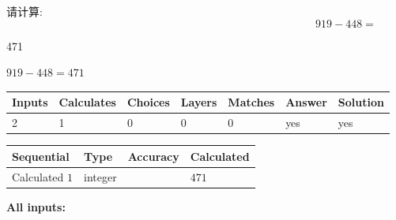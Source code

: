 \documentclass{ctexart}
\begin{document}
  
 
请计算:
\begin{equation}
919 -   %
448 = \nonumber
\end{equation}
 
 
 
\noindent{}
 
 

471
 
 
\noindent{}
 
 

 
 
 
\noindent{}
 
 

$ %
919 -  %
448=   %
471$
 
 
\noindent{}
 
 

 
   
   
   
   
\noindent\begin{tabular}{|l|l|l|l|l|l|l|}
 \hline
Inputs & Calculates & Choices & Layers & Matches & Answer & Solution \\ \hline
 2  & 
 1  & 
 0
  & 
 0  & 
 0  & 
  yes & 
  yes 
  \\ \hline
 \end{tabular}
   
   
   
   
\noindent{}
   
   
  
  
\noindent\begin{tabular}{|l|l|l|l|}
\hline
 Sequential & Type & Accuracy & Calculated \\ 
\hline
 
 
  Calculated $  1 $ & integer &  & 
  $ 471 $ 
 \\  \hline  
 \end{tabular}
   
   
   
   
\noindent\vspace{0.1in}\hspace{-0.08in} {\textbf{\Large{All inputs: }}}
   
\end{document}
